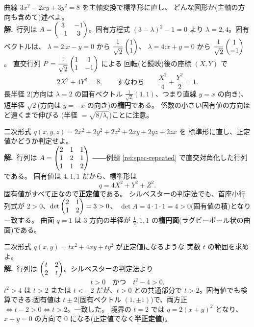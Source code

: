 \begin{rei}[例題・標準(主軸変換)]\label{rei:quad-principal}
曲線 $3x^2 - 2xy + 3y^2 = 8$ を主軸変換で標準形に直し、
どんな図形か(主軸の方向も含めて)述べよ。\\
\textbf{解.}\ 行列は $A = \begin{pmatrix}3 & -1 \\ -1 & 3\end{pmatrix}$。固有方程式
$(3 - \lambda)^2 - 1 = 0$ より $\lambda = 2, 4$。固有ベクトルは、
$\lambda = 2$:$x - y = 0$ から $\dfrac{1}{\sqrt{2}}\begin{pmatrix}1 \\ 1\end{pmatrix}$、
$\lambda = 4$:$x + y = 0$ から $\dfrac{1}{\sqrt{2}}\begin{pmatrix}1 \\ -1\end{pmatrix}$。
直交行列 $P = \dfrac{1}{\sqrt{2}}\begin{pmatrix}1 & 1 \\ 1 & -1\end{pmatrix}$ による
回転(と鏡映)後の座標 $(X, Y)$ で
\[
2X^2 + 4Y^2 = 8, \qquad\text{すなわち}\qquad
\frac{X^2}{4} + \frac{Y^2}{2} = 1.
\]
長半径 $2$(方向は $\lambda = 2$ の固有ベクトル
$\frac{1}{\sqrt{2}}(1, 1)$、つまり直線 $y = x$ の向き)、
短半径 $\sqrt{2}$(方向は $y = -x$ の向き)の\textbf{楕円}である。
係数の小さい固有値の方向ほど遠くまで伸びる
(半径 $= \sqrt{8/\lambda_i}$)ことに注意。
\end{rei}

\begin{rei}[例題・標準($3$ 変数の分類)]\label{rei:quad-3var}
二次形式 $q(x, y, z) = 2x^2 + 2y^2 + 2z^2 + 2xy + 2yz + 2zx$ を
標準形に直し、正定値かどうか判定せよ。\\
\textbf{解.}\ 行列は $A = \begin{pmatrix}2 & 1 & 1 \\ 1 & 2 & 1 \\ 1 & 1 & 2\end{pmatrix}$
――例題 \ref{rei:spec-repeated} で直交対角化した行列である。
固有値は $4, 1, 1$ だから、標準形は
\[
q = 4X^2 + Y^2 + Z^2.
\]
固有値がすべて正なので\textbf{正定値}である。
シルベスターの判定法でも、首座小行列式が
$2 > 0$、$\det\begin{pmatrix}2 & 1 \\ 1 & 2\end{pmatrix} = 3 > 0$、
$\det A = 4 \cdot 1 \cdot 1 = 4 > 0$(固有値の積)となり一致する。
曲面 $q = 1$ は $3$ 方向の半径が
$\frac{1}{2}, 1, 1$ の\textbf{楕円面}(ラグビーボール状の曲面)である。
\end{rei}

\begin{rei}[例題・標準(パラメータの範囲)]\label{rei:quad-param}
二次形式 $q(x, y) = tx^2 + 4xy + ty^2$ が正定値になるような
実数 $t$ の範囲を求めよ。\\
\textbf{解.}\ 行列は $\begin{pmatrix}t & 2 \\ 2 & t\end{pmatrix}$。シルベスターの判定法より
\[
t > 0 \quad\text{かつ}\quad t^2 - 4 > 0.
\]
$t^2 > 4$ は $t > 2$ または $t < -2$ だが、$t > 0$ との共通部分で
$t > 2$。固有値でも検算できる:固有値は $t \pm 2$(固有ベクトル
$(1, \pm 1)$)で、両方正 $\iff t - 2 > 0 \iff t > 2$。一致した。
境界の $t = 2$ では $q = 2(x + y)^2$ となり、$x + y = 0$ の方向で
$0$ になる(正定値でなく\textbf{半正定値})。
\end{rei}


